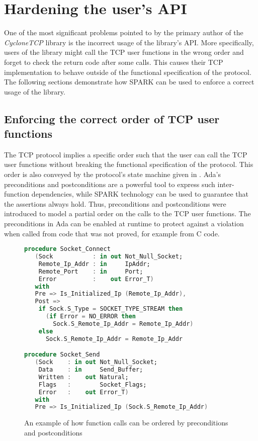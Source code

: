 \documentclass[conference]{IEEEtran}
\begin{document}
\section{Hardening the user's API}
\label{sec:API}

One of the most significant problems pointed to by the primary author of the \emph{CycloneTCP} library is the incorrect usage of the library's API. More specifically, users of the library might call the TCP user functions in the wrong order and forget to check the return code after some calls. This causes their TCP implementation to behave outside of the functional specification of the protocol. The following sections demonstrate how SPARK can be used to enforce a correct usage of the library.

\subsection{Enforcing the correct order of TCP user functions}

The TCP protocol implies a specific order such that the user can call the TCP user functions without breaking the functional specification of the protocol. This order is also conveyed by the protocol's state machine given in . Ada's preconditions and postconditions are a powerful tool to express such inter-function dependencies, while SPARK technology can be used to guarantee that the assertions always hold. Thus, preconditions and postconditions were introduced to model a partial order on the calls to the TCP user functions. The preconditions in Ada can be enabled at runtime to protect against a violation when called from code that was not proved, for example from C code.

\begin{figure}
\begin{lstlisting}[language=Ada,basicstyle=\footnotesize\ttfamily, frame=bottomline]
procedure Socket_Connect
   (Sock           : in out Not_Null_Socket;
    Remote_Ip_Addr : in     IpAddr;
    Remote_Port    : in     Port;
    Error          :    out Error_T)
   with
   Pre => Is_Initialized_Ip (Remote_Ip_Addr),
   Post =>
    if Sock.S_Type = SOCKET_TYPE_STREAM then
      (if Error = NO_ERROR then
        Sock.S_Remote_Ip_Addr = Remote_Ip_Addr)
    else
      Sock.S_Remote_Ip_Addr = Remote_Ip_Addr

procedure Socket_Send
   (Sock    : in out Not_Null_Socket;
    Data    : in     Send_Buffer;
    Written :    out Natural;
    Flags   :        Socket_Flags;
    Error   :    out Error_T)
   with
   Pre => Is_Initialized_Ip (Sock.S_Remote_Ip_Addr)
\end{lstlisting}
\caption{An example of how function calls can be ordered by preconditions and
postconditions}
\label{fig:functionorder}
\end{figure}
\end{document}
